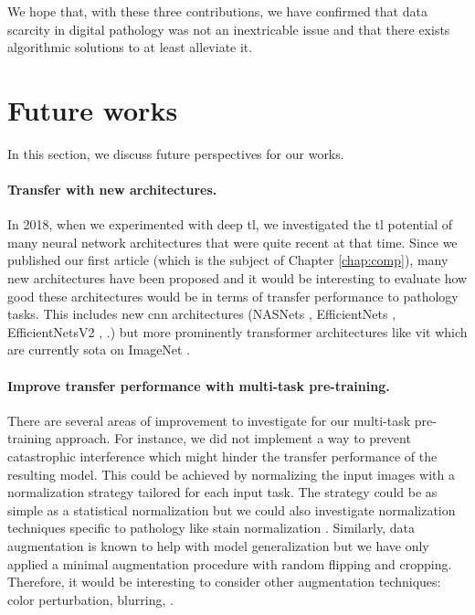 We hope that, with these three contributions, we have confirmed that data scarcity in digital pathology was not an inextricable issue and that there exists algorithmic solutions to at least alleviate it. 

\section{Future works}
\label{sec:concl:futureworks}

In this section, we discuss future perspectives for our works.

\paragraph{Transfer with new architectures.} In 2018, when we experimented with deep \acrlong{tl}, we investigated the \acrlong{tl} potential of many neural network architectures that were quite recent at that time. Since we published our first article (which is the subject of Chapter \ref{chap:comp}), many new architectures have been proposed and it would be interesting to evaluate how good these architectures would be in terms of transfer performance to pathology tasks. This includes new \acrlong{cnn} architectures (\eg NASNets \cite{zoph2018learning}, EfficientNets \cite{tan2019efficientnet}, EfficientNetsV2 \cite{tan2021efficientnetv2}, \etc.) but more prominently transformer architectures like \acrshort{vit} which are currently \acrlong{sota} on ImageNet \cite{yu2022coca}.

\paragraph{Improve transfer performance with multi-task pre-training.} There are several areas of improvement to investigate for our multi-task pre-training approach. For instance, we did not implement a way to prevent catastrophic interference which might hinder the transfer performance of the resulting model. This could be achieved by normalizing the input images with a normalization strategy tailored for each input task. The strategy could be as simple as a statistical normalization but we could also investigate normalization techniques specific to pathology like stain normalization \cite{kang2021stainnet, runz2021normalization}. Similarly, data augmentation is known to help with model generalization but we have only applied a minimal augmentation procedure with random flipping and cropping. Therefore, it would be interesting to consider other augmentation techniques: color perturbation, blurring, \etc. 


